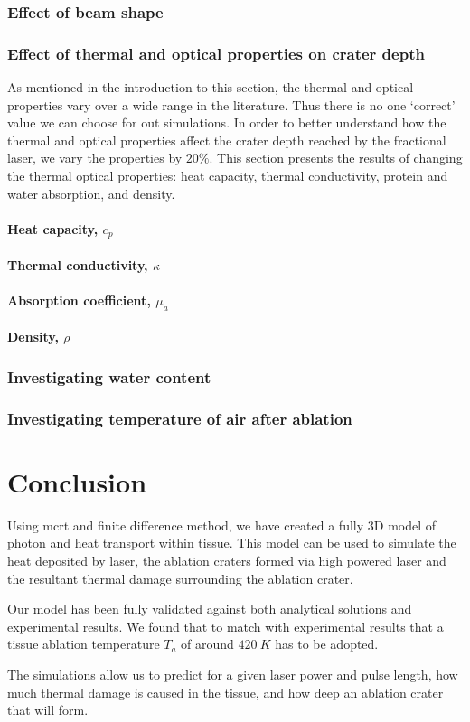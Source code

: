 \subsubsection{Effect of beam shape}
\subsubsection{Effect of thermal and optical properties on crater depth}

As mentioned in the introduction to this section, the thermal and optical properties vary over a wide range in the literature. Thus there is no one `correct' value we can choose for out simulations. In order to better understand how the thermal and optical properties affect the crater depth reached by the fractional laser, we vary the properties by $20\%$. This section presents the results of changing the thermal optical properties: heat capacity, thermal conductivity, protein and water absorption, and density.

\paragraph{Heat capacity, $c_p$}
\paragraph{Thermal conductivity, $\kappa$}
\paragraph{Absorption coefficient, $\mu_a$}
\paragraph{Density, $\rho$}


\subsubsection{Investigating water content}
 
\subsubsection{Investigating temperature of air after ablation}  

\section{Conclusion}

Using \gls{mcrt} and finite difference method, we have created a fully 3D model of photon and heat transport within tissue. This model can be used to simulate the heat deposited by laser, the ablation craters formed via high powered laser and the resultant thermal damage surrounding the ablation crater.

Our model has been fully validated against both analytical solutions and experimental results. We found that to match with experimental results that a tissue ablation temperature $T_a$ of around $420~K$ has to be adopted.

The simulations allow us to predict for a given laser power and pulse length, how much thermal damage is caused in the tissue, and how deep an ablation crater that will form.
